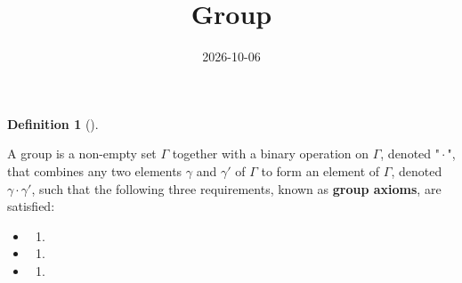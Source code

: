 \documentclass[
  british,
]{article}
\title{Group}
\author{}
\date{2026-10-06}
\providecommand{\tightlist}{%
  \setlength{\itemsep}{0pt}\setlength{\parskip}{0pt}}
\theoremstyle{definition}
\newtheorem{definition}{Definition}[section]
\theoremstyle{remark}
\newcommand{\Group}{{\Gamma}}
\newcommand{\GroupElement}{{\gamma}}
\newcommand{\GroupOperation}[2]{{#1}\cdot{#2}}
\begin{document}
\maketitle


\begin{definition}[]\protect\hypertarget{def-group}{}\label{def-group}

A group is a non-empty set \(\Group\) together with a binary operation
on \(\Group\), denoted "\(\GroupOperation{}{}\)", that combines any two
elements \(\GroupElement\) and \(\GroupElement'\) of \(\Group\) to form
an element of \(\Group\), denoted
\(\GroupOperation{\GroupElement}{\GroupElement'}\), such that the
following three requirements, known as \textbf{group axioms}, are
satisfied:

\begin{itemize}
\tightlist
\item
  \begin{enumerate}
  \def\labelenumi{\arabic{enumi}.}
  \tightlist
  \item
  \end{enumerate}
\item
  \begin{enumerate}
  \def\labelenumi{\arabic{enumi}.}
  \setcounter{enumi}{1}
  \tightlist
  \item
  \end{enumerate}
\item
  \begin{enumerate}
  \def\labelenumi{\arabic{enumi}.}
  \setcounter{enumi}{2}
  \tightlist
  \item
  \end{enumerate}
\end{itemize}

\end{definition}
\end{document}
